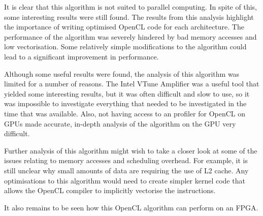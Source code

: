\par{It is clear that this algorithm is not suited to parallel computing. 
    In spite of this, some interesting results were still found. 
    The results from this analysis highlight the importance of 
    writing optimised OpenCL code for each architecture. 
    The performance of the algorithm was severely hindered 
    by bad memory accesses and low vectorisation. Some relatively simple 
    modifications to the algorithm could lead to a significant improvement 
    in performance.}

\par{Although some useful results were found, the analysis of this algorithm 
    was limited for a number of reasons. The Intel VTune Amplifier was a 
    useful tool that yielded some interesting results, but it was often 
    difficult and slow to use, so it was impossible to investigate everything 
    that needed to be investigated in the time that was available. Also, 
    not having access to an profiler for OpenCL on GPUs made accurate, 
    in-depth analysis of the algorithm on the GPU very difficult.}

\par{Further analysis of this algorithm might wish to take a 
    closer look at some of the issues relating to memory accesses 
    and scheduling overhead. For example, it is still unclear why 
    small amounts of data are requiring the use of L2 cache. 
    Any optimisations to this algorithm would need to create simpler 
    kernel code that allows the OpenCL compiler to implicitly vectorise 
    the instructions.}

\par{It also remains to be seen how this OpenCL algorithm can perform 
    on an FPGA.}
